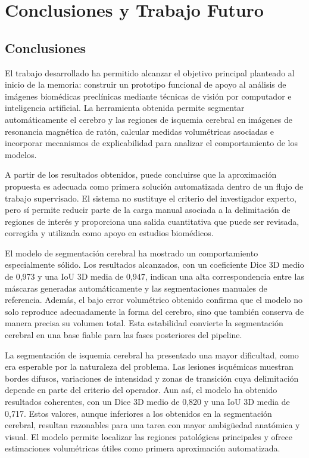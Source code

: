 \chapter{Conclusiones y Trabajo Futuro}
\label{cap:Conclusiones}
\section{Conclusiones}

El trabajo desarrollado ha permitido alcanzar el objetivo principal planteado al inicio de la memoria: 
construir un prototipo funcional de apoyo al análisis de imágenes biomédicas preclínicas mediante técnicas de visión por computador e inteligencia artificial.
La herramienta obtenida permite segmentar automáticamente el cerebro y las regiones de isquemia cerebral en imágenes de resonancia magnética de ratón, calcular 
medidas volumétricas asociadas e incorporar mecanismos de explicabilidad para analizar el comportamiento de los modelos.

A partir de los resultados obtenidos, puede concluirse que la aproximación propuesta es adecuada como primera solución automatizada dentro de un flujo de trabajo supervisado.
El sistema no sustituye el criterio del investigador experto, pero sí permite reducir parte de la carga manual asociada a la delimitación de regiones de interés y proporciona 
una salida cuantitativa que puede ser revisada, corregida y utilizada como apoyo en estudios biomédicos.

El modelo de segmentación cerebral ha mostrado un comportamiento especialmente sólido. Los resultados alcanzados, con un coeficiente Dice 3D medio de 0,973 y una IoU 3D media 
de 0,947, indican una alta correspondencia entre las máscaras generadas automáticamente y las segmentaciones manuales de referencia. Además, el bajo error volumétrico obtenido 
confirma que el modelo no solo reproduce adecuadamente la forma del cerebro, sino que también conserva de manera precisa su volumen total. Esta estabilidad convierte la segmentación
cerebral en una base fiable para las fases posteriores del pipeline.

La segmentación de isquemia cerebral ha presentado una mayor dificultad, como era esperable por la naturaleza del problema. Las lesiones isquémicas muestran bordes difusos, 
variaciones de intensidad y zonas de transición cuya delimitación depende en parte del criterio del operador. Aun así, el modelo ha obtenido resultados coherentes, con un Dice 3D
medio de 0,820 y una IoU 3D media de 0,717. Estos valores, aunque inferiores a los obtenidos en la segmentación cerebral, resultan razonables para una tarea con mayor ambigüedad 
anatómica y visual. El modelo permite localizar las regiones patológicas principales y ofrece estimaciones volumétricas útiles como primera aproximación automatizada.

